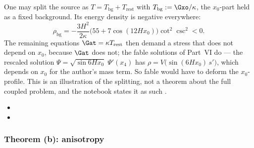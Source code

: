One may split the source as $T=T_{\mathrm{bg}}+T_{\mathrm{rest}}$ with $T_{\mathrm{bg}}:=\Gxo/\kappa$,
the $x_0$-part held as a fixed background. Its energy density is negative everywhere:
\[
  \rho_{\mathrm{bg}}=-\frac{3H^2}{2\kappa}\bigl(55+7\cos(12Hx_0)\bigr)\cot^2\csc^2<0 .
\]
The remaining equations $\Gat=\kappa T_{\mathrm{rest}}$ then demand a stress that does not depend on
$x_0$, because $\Gat$ does not; the fable solutions of Part~VI do --- the rescaled solution
$\Psi=\sqrt{\sin 6Hx_0}\;\Psi'(x_4)$ has $\rho=V\bigl(\sin(6Hx_0)\,s'\bigr)$, which depends on $x_0$ for the
author's mass term. So fable would have to deform the $x_0$-profile. This is an illustration of the
splitting, not a theorem about the full coupled problem, and the notebook states it as such
. 
\begin{itemize}
  \item {}
  \item {}
\end{itemize}

\subsubsection{Theorem (b): anisotropy}
\label{sec:4.2.6}

